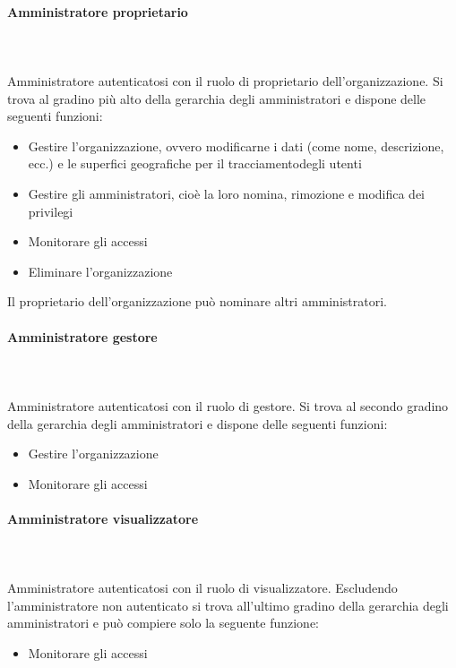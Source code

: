 \paragraph{Amministratore proprietario}\mbox{}\\ \\
Amministratore autenticatosi con il ruolo di proprietario dell'organizzazione.
Si trova al gradino più alto della gerarchia degli amministratori e dispone delle seguenti funzioni:
\begin{itemize}
\item Gestire l'organizzazione, ovvero modificarne i dati (come nome, descrizione, ecc.) e le superfici geografiche per il tracciamentodegli utenti
\item Gestire gli amministratori, cioè la loro nomina, rimozione e modifica dei privilegi
\item Monitorare gli accessi
\item Eliminare l'organizzazione
\end{itemize}
Il proprietario dell'organizzazione può nominare altri amministratori.
\paragraph{Amministratore gestore}\mbox{}\\ \\
Amministratore autenticatosi con il ruolo di gestore. 
Si trova al secondo gradino della gerarchia degli amministratori e dispone delle seguenti funzioni:
\begin{itemize}
\item Gestire l'organizzazione
\item Monitorare gli accessi
\end{itemize}
\paragraph{Amministratore visualizzatore}\mbox{}\\ \\
Amministratore autenticatosi con il ruolo di visualizzatore.
Escludendo l'amministratore non autenticato si trova all'ultimo gradino della gerarchia degli amministratori e può compiere solo la seguente funzione:
\begin{itemize}
\item Monitorare gli accessi
\end{itemize}




